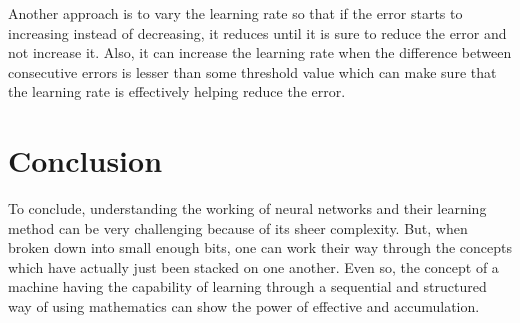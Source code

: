 \documentclass[conference,compsoc]{IEEEtran}
\begin{document}
Another approach is to vary the learning rate so that if the error starts to increasing instead of decreasing, it reduces until it is sure to reduce the error and not increase it. Also, it can increase the learning rate when the difference between consecutive errors is lesser than some threshold value which can make sure that the learning rate is effectively helping reduce the error.

\section{Conclusion}
To conclude, understanding the working of neural networks and their learning method can be very challenging because of its sheer complexity. But, when broken down into small enough bits, one can work their way through the concepts which have actually just been stacked on one another. Even so, the concept of a machine having the capability of learning through a sequential and structured way of using mathematics can show the power of effective and accumulation.
\end{document}
